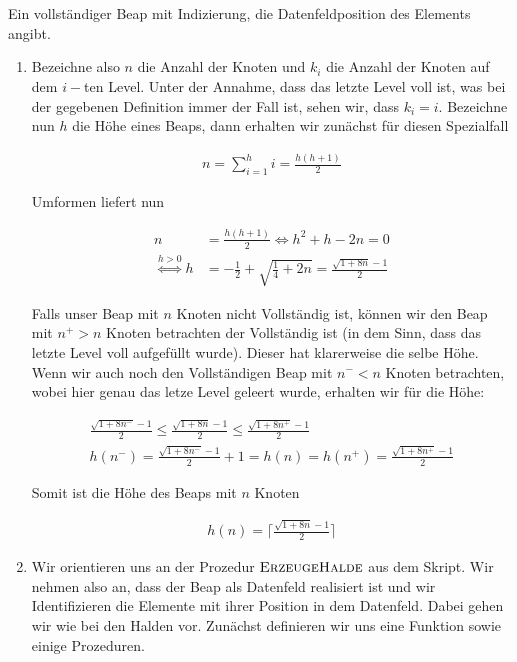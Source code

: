\begin{solution}
\phantom{}
\begin{center}
   \\
  \phantom{} \\
  Ein vollständiger Beap mit Indizierung, die Datenfeldposition des Elements angibt.
\end{center}



\begin{enumerate}[label = \alph*)]
  \item Bezeichne also $n$ die Anzahl der Knoten und $k_i$ die Anzahl der Knoten auf dem $i-$ten Level. Unter der Annahme, dass das letzte Level voll ist, was bei der gegebenen Definition immer der Fall ist, sehen wir, dass $k_i = i$. Bezeichne nun $h$ die Höhe eines Beaps, dann erhalten wir zunächst für diesen Spezialfall

  \begin{align*}
    n
    =
    \sum_{i=1}^h i
    =
    \frac{h(h+1)}{2}
  \end{align*}

  Umformen liefert nun

  \begin{align*}
    n
    &=
    \frac{h(h+1)}{2}
    \iff
    h^2 + h - 2n = 0 \\
    \stackrel{h > 0}{\iff}
    h &= -\frac{1}{2} + \sqrt{\frac{1}{4} + 2n}
    = \frac{\sqrt{1 + 8n} - 1}{2}
  \end{align*}

Falls unser Beap mit $n$ Knoten nicht Vollständig ist, können wir den Beap mit $n^+ > n$ Knoten betrachten der Vollständig ist (in dem Sinn, dass das letzte Level voll aufgefüllt wurde). Dieser hat klarerweise die selbe Höhe. Wenn wir auch noch den Vollständigen Beap mit $n^- < n$ Knoten betrachten, wobei hier genau das letze Level geleert wurde, erhalten wir für die Höhe:

\begin{align*}
 \frac{\sqrt{1 + 8n^-} - 1}{2}
 \leq
 \frac{\sqrt{1 + 8n} - 1}{2}
 \leq
 \frac{\sqrt{1 + 8n^+} - 1}{2} \\
  h(n^-) = \frac{\sqrt{1 + 8n^-} - 1}{2} + 1
  =
  h(n)
  =
  h(n^+) = \frac{\sqrt{1 + 8n^+} - 1}{2}
\end{align*}

Somit ist die Höhe des Beaps mit $n$ Knoten

\begin{align*}
  h(n)
  =
  \Big\lceil \frac{\sqrt{1 + 8n} - 1}{2}\Big\rceil
\end{align*}
  \item Wir orientieren uns an der Prozedur $\textsc{ErzeugeHalde}$ aus dem Skript. Wir nehmen also an, dass der Beap als Datenfeld realisiert ist und wir Identifizieren die Elemente mit ihrer Position in dem Datenfeld. Dabei gehen wir wie bei den Halden vor. Zunächst definieren wir uns eine Funktion sowie einige Prozeduren.


\end{enumerate}
\end{solution}
